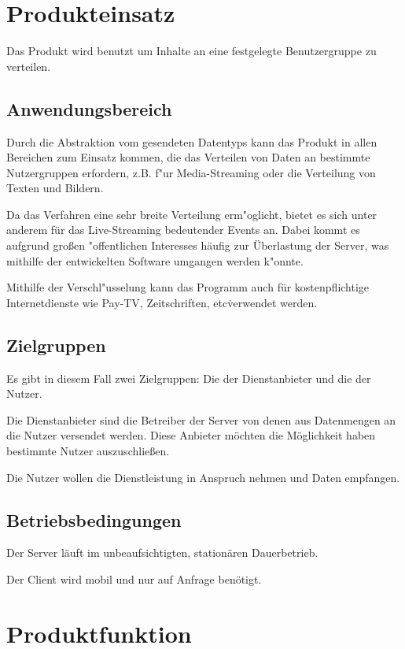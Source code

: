 \documentclass[a4paper,10pt]{scrartcl}
\begin{document}
\section{Produkteinsatz}

Das Produkt wird benutzt um Inhalte an eine festgelegte Benutzergruppe zu verteilen. 

\subsection{Anwendungsbereich}

Durch die Abstraktion vom gesendeten Datentyps kann das Produkt in allen Bereichen zum Einsatz kommen,
die das Verteilen von Daten an bestimmte Nutzergruppen erfordern, z.B. f"ur Media-Streaming oder
die Verteilung von Texten und Bildern.

Da das Verfahren eine sehr breite Verteilung erm"oglicht, bietet es sich unter anderem für das
Live-Streaming bedeutender Events an. Dabei kommt es aufgrund großen "offentlichen Interesses
häufig zur Überlastung der Server, was mithilfe der entwickelten Software umgangen werden k"onnte.

Mithilfe der Verschl"usselung kann das Programm auch für kostenpflichtige Internetdienste
wie Pay-TV, Zeitschriften, etc\. verwendet werden.

\subsection{Zielgruppen}

Es gibt in diesem Fall zwei Zielgruppen: Die der Dienstanbieter und die der Nutzer.

Die Dienstanbieter sind die Betreiber der Server von denen aus Datenmengen an die Nutzer versendet
werden. Diese Anbieter möchten die Möglichkeit haben bestimmte Nutzer auszuschließen.

Die Nutzer wollen die Dienstleistung in Anspruch nehmen und Daten empfangen.

\subsection{Betriebsbedingungen}

Der Server läuft im unbeaufsichtigten, stationären Dauerbetrieb.

Der Client wird mobil und nur auf Anfrage benötigt.

\section{Produktfunktion}
\end{document}

